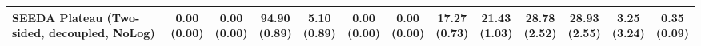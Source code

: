 \begin{table}[H]
{\begin{tabular}{l|cccccc|cccccc}
SEEDA Plateau (Two-sided, decoupled, NoLog) & \makecell{0.00 \\ (0.00)} & \makecell{0.00 \\ (0.00)} & {\cellcolor[HTML]{C8E6C9}} \bfseries \makecell{94.90 \\ (0.89)} & \makecell{5.10 \\ (0.89)} & \makecell{0.00 \\ (0.00)} & \makecell{0.00 \\ (0.00)} & \makecell{17.27 \\ (0.73)} & \makecell{21.43 \\ (1.03)} & {\cellcolor[HTML]{C8E6C9}} \makecell{28.78 \\ (2.52)} & \bfseries \makecell{28.93 \\ (2.55)} & \makecell{3.25 \\ (3.24)} & \makecell{0.35 \\ (0.09)} \\
\bottomrule
\end{tabular}
}%
\end{table}
